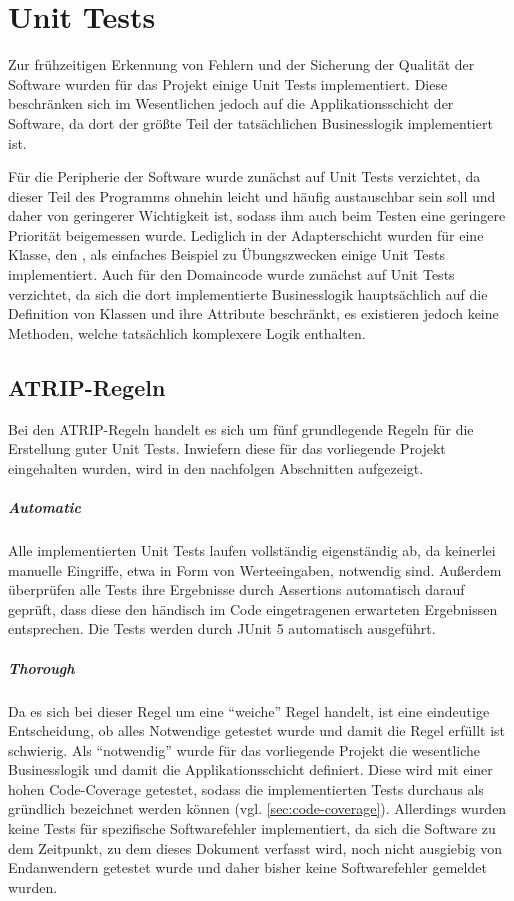 \chapter{Unit Tests}
Zur frühzeitigen Erkennung von Fehlern und der Sicherung der Qualität der Software wurden für das Projekt einige Unit Tests implementiert. Diese beschränken sich im Wesentlichen jedoch auf die Applikationsschicht der Software, da dort der größte Teil der tatsächlichen Businesslogik implementiert ist. 

Für die Peripherie der Software wurde zunächst auf Unit Tests verzichtet, da dieser Teil des Programms ohnehin leicht und häufig austauschbar sein soll und daher von geringerer Wichtigkeit ist, sodass ihm auch beim Testen eine geringere Priorität beigemessen wurde. Lediglich in der Adapterschicht wurden für eine Klasse, den , als einfaches Beispiel zu Übungszwecken einige Unit Tests implementiert. Auch für den Domaincode wurde zunächst auf Unit Tests verzichtet, da sich die dort implementierte Businesslogik hauptsächlich auf die Definition von Klassen und ihre Attribute beschränkt, es existieren jedoch keine Methoden, welche tatsächlich komplexere Logik enthalten.

\section{ATRIP-Regeln}
Bei den ATRIP-Regeln handelt es sich um fünf grundlegende Regeln für die Erstellung guter Unit Tests. Inwiefern diese für das vorliegende Projekt eingehalten wurden, wird in den nachfolgen Abschnitten aufgezeigt.

\paragraph{Automatic} Alle implementierten Unit Tests laufen vollständig eigenständig ab, da keinerlei manuelle Eingriffe, etwa in Form von Werteeingaben, notwendig sind. Außerdem überprüfen alle Tests ihre Ergebnisse durch Assertions automatisch darauf geprüft, dass diese den händisch im Code eingetragenen erwarteten Ergebnissen entsprechen. Die Tests werden durch JUnit 5 automatisch ausgeführt.

\paragraph{Thorough} Da es sich bei dieser Regel um eine \enquote{weiche} Regel handelt, ist eine eindeutige Entscheidung, ob alles Notwendige getestet wurde und damit die Regel erfüllt ist schwierig. Als \enquote{notwendig} wurde für das vorliegende Projekt die wesentliche Businesslogik und damit die Applikationsschicht definiert. Diese wird mit einer hohen Code-Coverage getestet, sodass die implementierten Tests durchaus als gründlich bezeichnet werden können (vgl. \autoref{sec:code-coverage}). Allerdings wurden keine Tests für spezifische Softwarefehler implementiert, da sich die Software zu dem Zeitpunkt, zu dem dieses Dokument verfasst wird, noch nicht ausgiebig von Endanwendern getestet wurde und daher bisher keine Softwarefehler gemeldet wurden.


